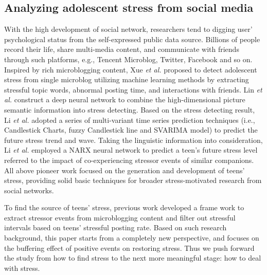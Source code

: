 \subsection{Analyzing adolescent stress from social media}
With the high development of social network,
researchers tend to digging user' psychological status from the self-expressed public data source.
Billions of people record their life, share multi-media content, and communicate with friends through such platforms, e.g.,
Tencent Microblog, Twitter, Facebook and so on.
Inspired by rich microblogging content,
Xue \emph{et al.} \cite{XueUbicomp13, Xue2014Detecting} proposed to detect adolescent stress from single microblog utilizing machine learning methods by extracting stressful topic words, abnormal posting time, and interactions with friends.
Lin \emph{et al.} \cite{Lin2014User} construct a deep neural network to combine the high-dimensional picture semantic information into stress detecting.
Based on the stress detecting result,
Li \emph{et al.} \cite{Li2015Predicting}\cite{Li2015Using}\cite{Li2015When} adopted a series of multi-variant time series prediction techniques (i.e., Candlestick Charts, fuzzy Candlestick line and  SVARIMA model) to predict the future stress trend and wave.
Taking the linguistic information into consideration,
Li \emph{et al.} \cite{Li2017Exploring} employed a NARX neural network to predict a teen's future stress level referred to the impact of co-experiencing stressor events of similar companions.
All above pioneer work focused on the generation and development of teens' stress, providing solid basic techniques for broader stress-motivated research from social networks.

To find the source of teens' stress, previous work \cite{Li2017Analyzing} developed a frame work to extract stressor events from microblogging content and filter out stressful intervals based on teens' stressful posting rate.
Based on such research background, this paper starts from a completely new perspective, and focuses on the buffering effect of positive events on restoring stress.
Thus we push forward the study from how to find stress to the next more meaningful stage: how to deal with stress.


